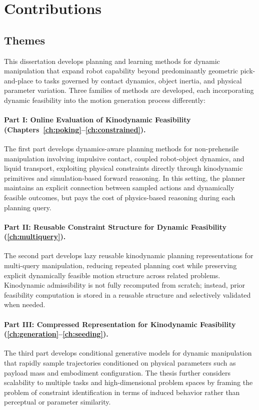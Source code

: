\section{Contributions}



\subsection{Themes}
\label{sec:intro:statement}

This dissertation develops planning and learning methods for dynamic manipulation that expand robot capability beyond predominantly geometric pick-and-place to tasks governed by contact dynamics, object inertia, and physical parameter variation.
Three families of methods are developed, each incorporating dynamic feasibility into the motion generation process differently:

\paragraph{Part I: Online Evaluation of Kinodynamic Feasibility (Chapters~\ref{ch:poking}--\ref{ch:constrained}).}
The first part develops dynamics-aware planning methods for non-prehensile manipulation involving impulsive contact, coupled robot-object dynamics, and liquid transport, exploiting physical constraints directly through kinodynamic primitives and simulation-based forward reasoning.
In this setting, the planner maintains an explicit connection between sampled actions and dynamically feasible outcomes, but pays the cost of physics-based reasoning during each planning query.

\paragraph{Part II: Reusable Constraint Structure for Dynamic Feasibility (\cref{ch:multiquery}).}
The second part develops lazy reusable kinodynamic planning representations for multi-query manipulation, reducing repeated planning cost while preserving explicit dynamically feasible motion structure across related problems.
Kinodynamic admissibility is not fully recomputed from scratch; instead, prior feasibility computation is stored in a reusable structure and selectively validated when needed.


\paragraph{Part III: Compressed Representation for Kinodynamic Feasibility (\cref{ch:generation}--\cref{ch:seeding}).}
The third part develops conditional generative models for dynamic manipulation that rapidly sample trajectories conditioned on physical parameters such as payload mass and embodiment configuration.
The thesis further considers scalability to multiple tasks and high-dimensional problem spaces by framing the problem of constraint identification in terms of induced behavior rather than perceptual or parameter similarity.


